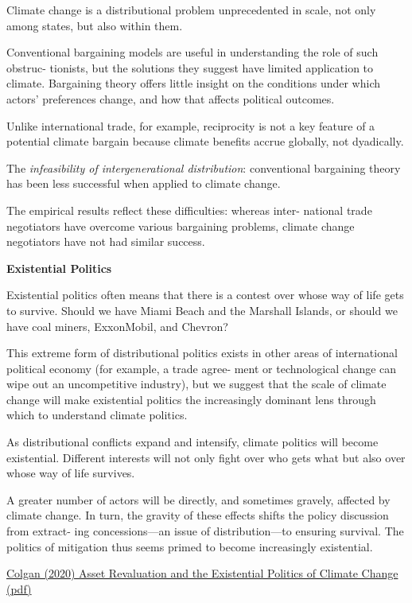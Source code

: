 \documentclass[
]{book}
\begin{document}
Climate change is a distributional problem unprecedented in scale,
not only among states, but also within them.

Conventional bargaining models are useful in understanding the role of such obstruc-
tionists, but the solutions they suggest have limited application to climate.
Bargaining theory offers little insight on the conditions
under which actors' preferences change, and how that affects political outcomes.

Unlike international trade, for example, reciprocity is not a key feature of a
potential climate bargain because climate benefits accrue globally, not dyadically.

The \emph{infeasibility of intergenerational distribution}:
conventional bargaining theory has been less successful when
applied to climate change.

The empirical results reflect these difficulties: whereas inter-
national trade negotiators have overcome various bargaining problems, climate change
negotiators have not had similar success.

\textbf{Existential Politics}

Existential
politics often means that there is a contest over whose way of life gets to survive.
Should we have Miami Beach and the Marshall Islands, or should we have coal
miners, ExxonMobil, and Chevron?

This extreme form of distributional politics
exists in other areas of international political economy (for example, a trade agree-
ment or technological change can wipe out an uncompetitive industry), but we
suggest that the scale of climate change will make existential politics the increasingly
dominant lens through which to understand climate politics.

As distributional conflicts expand and intensify, climate politics will become
existential.
Different interests will not only fight over who gets what but also over
whose way of life survives.

A greater
number of actors will be directly, and sometimes gravely, affected by climate
change. In turn, the gravity of these effects shifts the policy discussion from extract-
ing concessions---an issue of distribution---to ensuring survival. The politics of
mitigation thus seems primed to become increasingly existential.

\href{https://www.cambridge.org/core/journals/international-organization/article/asset-revaluation-and-the-existential-politics-of-climate-change/0963988860A37F6988E73738EA93E0A1\#}{Colgan (2020) Asset Revaluation and the Existential Politics of Climate Change}
\href{pdf/Colgan_2020_Asset_Climate_Politics.pdf}{(pdf)}
\end{document}
